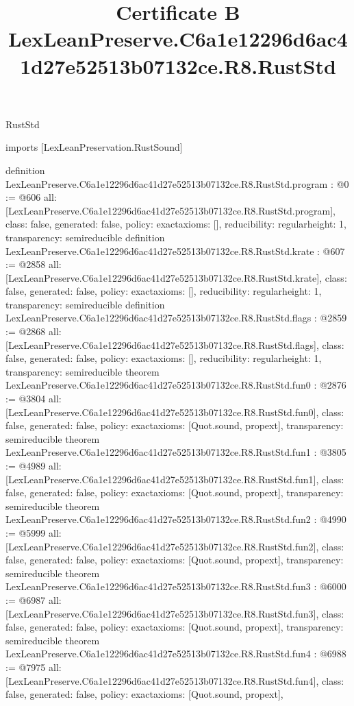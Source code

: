 \begin{lexlean}{RustStd}
\title{Certificate B LexLeanPreserve.C6a1e12296d6ac41d27e52513b07132ce.R8.RustStd}
\begin{coremodule}
imports [LexLeanPreservation.RustSound]

definition LexLeanPreserve.C6a1e12296d6ac41d27e52513b07132ce.R8.RustStd.program : @0 := @606 {
  all: [LexLeanPreserve.C6a1e12296d6ac41d27e52513b07132ce.R8.RustStd.program],
  class: false,
  generated: false,
  policy: exact{axioms: []},
  reducibility: regular{height: 1},
  transparency: semireducible
}
definition LexLeanPreserve.C6a1e12296d6ac41d27e52513b07132ce.R8.RustStd.krate : @607 := @2858 {
  all: [LexLeanPreserve.C6a1e12296d6ac41d27e52513b07132ce.R8.RustStd.krate],
  class: false,
  generated: false,
  policy: exact{axioms: []},
  reducibility: regular{height: 1},
  transparency: semireducible
}
definition LexLeanPreserve.C6a1e12296d6ac41d27e52513b07132ce.R8.RustStd.flags : @2859 := @2868 {
  all: [LexLeanPreserve.C6a1e12296d6ac41d27e52513b07132ce.R8.RustStd.flags],
  class: false,
  generated: false,
  policy: exact{axioms: []},
  reducibility: regular{height: 1},
  transparency: semireducible
}
theorem LexLeanPreserve.C6a1e12296d6ac41d27e52513b07132ce.R8.RustStd.fun0 : @2876 := @3804 {
  all: [LexLeanPreserve.C6a1e12296d6ac41d27e52513b07132ce.R8.RustStd.fun0],
  class: false,
  generated: false,
  policy: exact{axioms: [Quot.sound, propext]},
  transparency: semireducible
}
theorem LexLeanPreserve.C6a1e12296d6ac41d27e52513b07132ce.R8.RustStd.fun1 : @3805 := @4989 {
  all: [LexLeanPreserve.C6a1e12296d6ac41d27e52513b07132ce.R8.RustStd.fun1],
  class: false,
  generated: false,
  policy: exact{axioms: [Quot.sound, propext]},
  transparency: semireducible
}
theorem LexLeanPreserve.C6a1e12296d6ac41d27e52513b07132ce.R8.RustStd.fun2 : @4990 := @5999 {
  all: [LexLeanPreserve.C6a1e12296d6ac41d27e52513b07132ce.R8.RustStd.fun2],
  class: false,
  generated: false,
  policy: exact{axioms: [Quot.sound, propext]},
  transparency: semireducible
}
theorem LexLeanPreserve.C6a1e12296d6ac41d27e52513b07132ce.R8.RustStd.fun3 : @6000 := @6987 {
  all: [LexLeanPreserve.C6a1e12296d6ac41d27e52513b07132ce.R8.RustStd.fun3],
  class: false,
  generated: false,
  policy: exact{axioms: [Quot.sound, propext]},
  transparency: semireducible
}
theorem LexLeanPreserve.C6a1e12296d6ac41d27e52513b07132ce.R8.RustStd.fun4 : @6988 := @7975 {
  all: [LexLeanPreserve.C6a1e12296d6ac41d27e52513b07132ce.R8.RustStd.fun4],
  class: false,
  generated: false,
  policy: exact{axioms: [Quot.sound, propext]},
}
\end{coremodule}
\end{lexlean}
